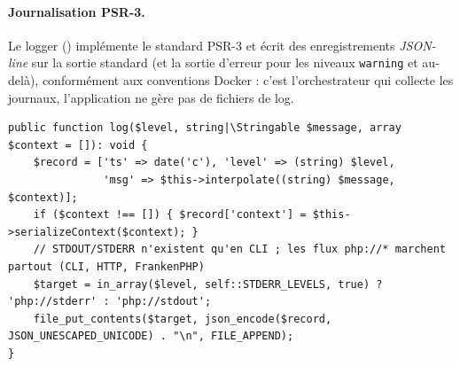 \paragraph{Journalisation PSR-3.} Le logger () implémente le standard
PSR-3 et écrit des enregistrements \emph{JSON-line} sur la sortie standard (et la sortie d'erreur
pour les niveaux \texttt{warning} et au-delà), conformément aux conventions Docker : c'est
l'orchestrateur qui collecte les journaux, l'application ne gère pas de fichiers de log.

\begin{lstlisting}[style=php, caption={Logger PSR-3, sortie JSON sur \texttt{php://stdout} — \file{src/Logger.php}}]
public function log($level, string|\Stringable $message, array $context = []): void {
    $record = ['ts' => date('c'), 'level' => (string) $level,
               'msg' => $this->interpolate((string) $message, $context)];
    if ($context !== []) { $record['context'] = $this->serializeContext($context); }
    // STDOUT/STDERR n'existent qu'en CLI ; les flux php://* marchent partout (CLI, HTTP, FrankenPHP)
    $target = in_array($level, self::STDERR_LEVELS, true) ? 'php://stderr' : 'php://stdout';
    file_put_contents($target, json_encode($record, JSON_UNESCAPED_UNICODE) . "\n", FILE_APPEND);
}
\end{lstlisting}


